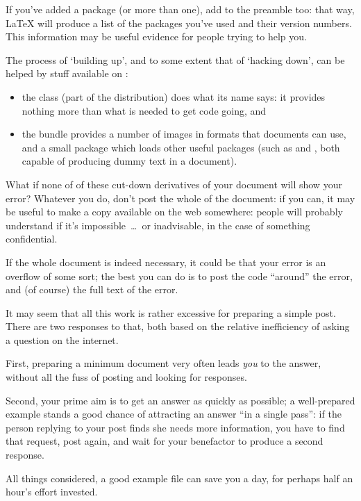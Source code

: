 If you've added a package (or more than one), add  to
the preamble too: that way, \LaTeX{} will produce a list of the
packages you've used and their version numbers.  This information may
be useful evidence for people trying to help you.

The process of `building up', and to some extent that of `hacking
down', can be helped by stuff available on :
\begin{itemize}
\item the  class (part of the \latex{} distribution)
  does what its name says: it provides nothing more than what is
  needed to get \latex{} code going, and
\item the  bundle provides a number of images in formats
  that \alltex{} documents can use, and a small package 
  which loads other useful packages (such as  and
  , both capable of producing dummy text in a
  document).
\end{itemize}

What if none of of these cut-down derivatives of your document will
show your error?  Whatever you do, don't post the whole of the document: if
you can, it may be useful to make a copy available on the web
somewhere: people will probably understand if it's impossible~\dots{}\ 
or inadvisable, in the case of something confidential.

If the whole document is indeed necessary, it could be that your
error is an overflow of some sort; the best you can do is to post the
code ``around'' the error, and (of course) the full text of the error.

It may seem that all this work is rather excessive for preparing a
simple post.  There are two responses to that, both based on the
relative inefficiency of asking a question on the internet.

First, preparing a minimum document very often leads \emph{you} to the
answer, without all the fuss of posting and looking for responses.

Second, your prime aim is to get an answer as quickly as possible; a
well-prepared example stands a good chance of attracting an answer
``in a single pass'': if the person replying to your post finds she
needs more information, you have to find that request, post again, and
wait for your benefactor to produce a second response.

All things considered, a good example file can save you a day, for
perhaps half an hour's effort invested.

